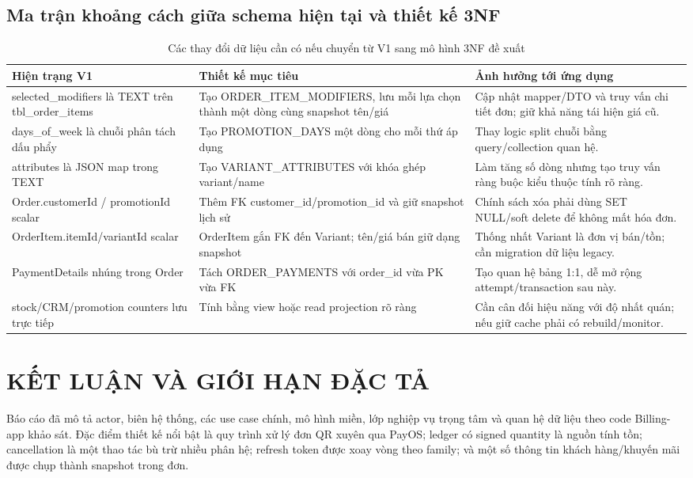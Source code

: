 \documentclass[12pt,a4paper,oneside]{report}
\begin{document}
\section{Ma trận khoảng cách giữa schema hiện tại và thiết kế 3NF}
\begin{table}[htbp]
\centering\small
\caption{Các thay đổi dữ liệu cần có nếu chuyển từ V1 sang mô hình 3NF đề xuất}
\begin{tabularx}{\textwidth}{@{}p{4.2cm}p{4.3cm}Y@{}}\toprule
Hiện trạng V1 & Thiết kế mục tiêu & Ảnh hưởng tới ứng dụng\\\midrule
selected\_modifiers là TEXT trên tbl\_order\_items & Tạo ORDER\_\allowbreak ITEM\_\allowbreak MODIFIERS, lưu mỗi lựa chọn thành một dòng cùng snapshot tên/giá & Cập nhật mapper/DTO và truy vấn chi tiết đơn; giữ khả năng tái hiện giá cũ.\\
days\_of\_week là chuỗi phân tách dấu phẩy & Tạo PROMOTION\_DAYS một dòng cho mỗi thứ áp dụng & Thay logic split chuỗi bằng query/collection quan hệ.\\
attributes là JSON map trong TEXT & Tạo VARIANT\_ATTRIBUTES với khóa ghép variant/name & Làm tăng số dòng nhưng tạo truy vấn ràng buộc kiểu thuộc tính rõ ràng.\\
Order.customerId / promotionId scalar & Thêm FK customer\_id/promotion\_id và giữ snapshot lịch sử & Chính sách xóa phải dùng SET NULL/soft delete để không mất hóa đơn.\\
OrderItem.itemId/variantId scalar & OrderItem gắn FK đến Variant; tên/giá bán giữ dạng snapshot & Thống nhất Variant là đơn vị bán/tồn; cần migration dữ liệu legacy.\\
PaymentDetails nhúng trong Order & Tách ORDER\_PAYMENTS với order\_id vừa PK vừa FK & Tạo quan hệ bảng 1:1, dễ mở rộng attempt/transaction sau này.\\
stock/CRM/promotion counters lưu trực tiếp & Tính bằng view hoặc read projection rõ ràng & Cần cân đối hiệu năng với độ nhất quán; nếu giữ cache phải có rebuild/monitor.\\
\bottomrule\end{tabularx}
\end{table}

\chapter*{KẾT LUẬN VÀ GIỚI HẠN ĐẶC TẢ}
Báo cáo đã mô tả actor, biên hệ thống, các use case chính, mô hình miền, lớp nghiệp vụ trọng tâm và quan hệ dữ liệu theo code Billing-app khảo sát. Đặc điểm thiết kế nổi bật là quy trình xử lý đơn QR xuyên qua PayOS; ledger có signed quantity là nguồn tính tồn; cancellation là một thao tác bù trừ nhiều phân hệ; refresh token được xoay vòng theo family; và một số thông tin khách hàng/khuyến mãi được chụp thành snapshot trong đơn.
\end{document}
